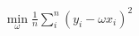 \documentclass[preview]{standalone}
\begin{document}
\begin{align*}
\min_\omega \frac{1}{n} \sum_i^n (y_i -\omega x_i)^2
\end{align*}
\end{document}
